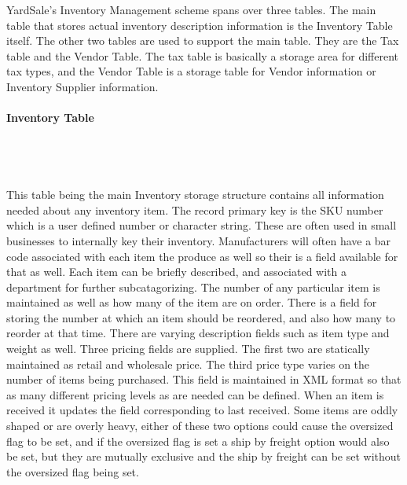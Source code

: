 \documentclass{report}
\begin{document}
        YardSale's Inventory Management scheme spans over three tables. The main table that
        stores actual inventory description information is the Inventory Table itself. The
        other two tables are used to support the main table. They are the Tax table and the
        Vendor Table. The tax table is basically a storage area for different tax types, and
        the Vendor Table is a storage table for Vendor information or Inventory Supplier
        information.\\
        \\
        {\bf Inventory Table}\\
        \\
        \\
        \\
        \\
        This table being the main Inventory storage structure contains all information needed
        about any inventory item. The record primary key is the SKU number which is a user
        defined number or character string. These are often used in small businesses to
        internally key their inventory. Manufacturers will often have a bar code associated
        with each item the produce as well so their is a field available for that as well.
        Each item can be briefly described, and associated with a department for further
        subcatagorizing. The number of any particular item is maintained as well as how many
        of the item are on order. There is a field for storing the number at which an item should
        be reordered, and also how many to reorder at that time. There are varying description
        fields such as item type and weight as well. Three pricing fields are supplied. The
        first two are statically maintained as retail and wholesale price. The third price
        type varies on the number of items being purchased. This field is maintained in XML
        format so that as many different pricing levels as are needed can be defined. When an
        item is received it updates the field corresponding to last received. Some items are
        oddly shaped or are overly heavy, either of these two options could cause the oversized
        flag to be set, and if the oversized flag is set a ship by freight option would also be
        set, but they are mutually exclusive and the ship by freight can be set without the
        oversized flag being set.\\
        \\
\end{document}
